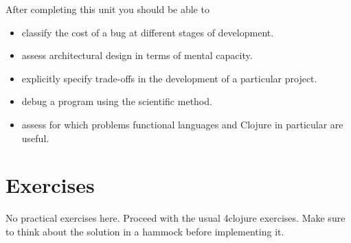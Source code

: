\documentclass[11pt,a4paper]{article}
\begin{document}
After completing this unit you should be able to

\begin{itemize}
    \item classify the cost of a bug at different stages of development.
    \item assess architectural design in terms of mental capacity.
    \item explicitly specify trade-offs in the development of a particular project.
    \item debug a program using the scientific method.
    \item assess for which problems functional languages and Clojure in particular are useful.
\end{itemize}



\section{Exercises}

No practical exercises here.
Proceed with the usual 4clojure exercises.
Make sure to think about the solution in a hammock before implementing it.
\end{document}
